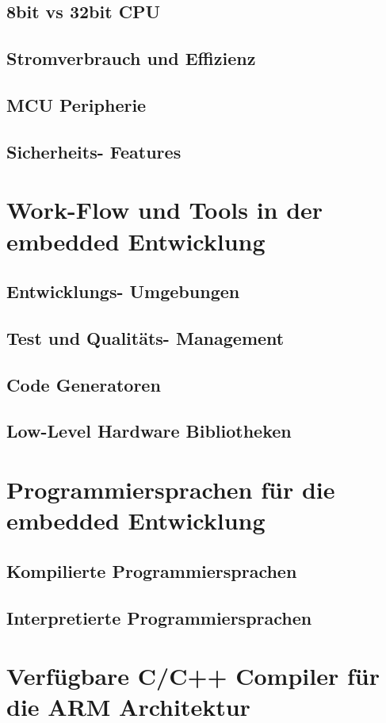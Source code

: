 \documentclass[MES,Master,ngerman]{twbook}%
\begin{document}
\subsection{8bit vs 32bit CPU}
\subsection{Stromverbrauch und Effizienz}
\subsection{MCU Peripherie}
\subsection{Sicherheits- Features}
\section{Work-Flow und Tools in der embedded Entwicklung}
\subsection{Entwicklungs- Umgebungen}
\subsection{Test und Qualitäts- Management}
\subsection{Code Generatoren}
\subsection{Low-Level Hardware Bibliotheken}
\section{Programmiersprachen für die embedded Entwicklung}
\subsection{Kompilierte Programmiersprachen}
\subsection{Interpretierte Programmiersprachen}
\section{Verfügbare C/C++ Compiler für die ARM Architektur}
\end{document}
